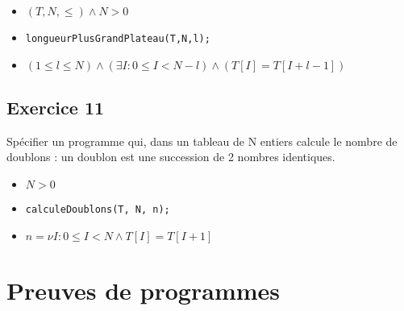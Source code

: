 \begin{itemize}
	\item $(T, N, \leq) \wedge N > 0$
	\item \texttt{longueurPlusGrandPlateau(T,N,l);}
	\item $(1 \leq l \leq N) \wedge (\exists I : 0 \leq I < N-l)\wedge (T[I] = T[I+l-1])$ 
\end{itemize}
	\subsection{Exercice 11}
		Spécifier un programme qui, dans un tableau de N entiers calcule le nombre de doublons : un doublon est une succession de 2 nombres identiques.

		\begin{itemize}
			\item $N > 0$
			\item \texttt{calculeDoublons(T, N, n);}
			\item $n = \nu I : 0 \leq I < N \wedge T[I] = T[I+1]$
		\end{itemize}

	\section{Preuves de programmes}
